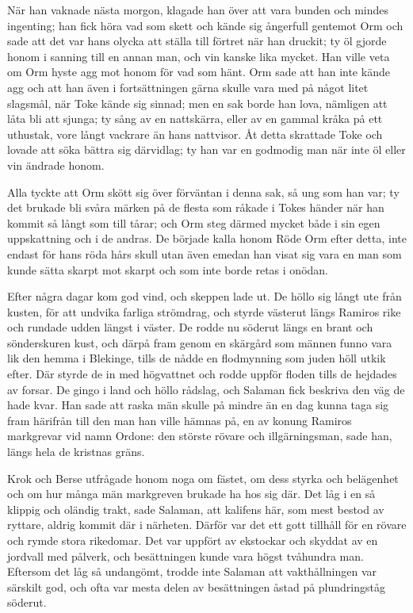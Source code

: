 \initial När han vaknade nästa morgon, klagade han över att vara bunden och mindes ingenting; han fick höra vad som skett och kände sig ångerfull gentemot Orm och sade att det var hans olycka att ställa till förtret när han druckit; ty öl gjorde honom i sanning till en annan man, och vin kanske lika mycket. Han ville veta om Orm hyste agg mot honom för vad som hänt. Orm sade att han inte kände agg och att han även i fortsättningen gärna skulle vara med på något litet slagsmål, när Toke kände sig sinnad; men en sak borde han lova, nämligen att låta bli att sjunga; ty sång av en nattskärra, eller av en gammal kråka på ett uthustak, vore långt vackrare än hans nattvisor. Åt detta skrattade Toke och lovade att söka bättra sig därvidlag; ty han var en godmodig man när inte öl eller vin ändrade honom.

\initial Alla tyckte att Orm skött sig över förväntan i denna sak, så ung som han var; ty det brukade bli svåra märken på de flesta som råkade i Tokes händer när han kommit så långt som till tårar; och Orm steg därmed mycket både i sin egen uppskattning och i de andras. De började kalla honom Röde Orm efter detta, inte endast för hans röda hårs skull utan även emedan han visat sig vara en man som kunde sätta skarpt mot skarpt och som inte borde retas i onödan.

\initial Efter några dagar kom god vind, och skeppen lade ut. De höllo sig långt ute från kusten, för att undvika farliga strömdrag, och styrde västerut längs Ramiros rike och rundade udden längst i väster. De rodde nu söderut längs en brant och sönderskuren kust, och därpå fram genom en skärgård som männen funno vara lik den hemma i Blekinge, tills de nådde en flodmynning som juden höll utkik efter. Där styrde de in med högvattnet och rodde uppför floden tills de hejdades av forsar. De gingo i land och höllo rådslag, och Salaman fick beskriva den väg de hade kvar. Han sade att raska män skulle på mindre än en dag kunna taga sig fram härifrån till den man han ville hämnas på, en av konung Ramiros markgrevar vid namn Ordone: den störste rövare och illgärningsman, sade han, längs hela de kristnas gräns.

\initial Krok och Berse utfrågade honom noga om fästet, om dess styrka och belägenhet och om hur många män markgreven brukade ha hos sig där. Det låg i en så klippig och oländig trakt, sade Salaman, att kalifens här, som mest bestod av ryttare, aldrig kommit där i närheten. Därför var det ett gott tillhåll för en rövare och rymde stora rikedomar. Det var uppfört av ekstockar och skyddat av en jordvall med pålverk, och besättningen kunde vara högst tvåhundra man. Eftersom det låg så undangömt, trodde inte Salaman att vakthållningen var särskilt god, och ofta var mesta delen av besättningen åstad på plundringståg söderut.


